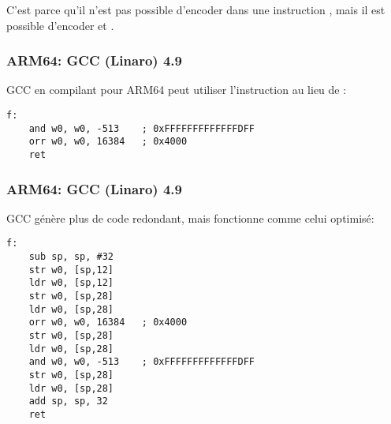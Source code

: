 C'est parce qu'il n'est pas possible d'encoder  dans une instruction ,
mais il est possible d'encoder  et .

\subsubsection{ARM64: GCC (Linaro) 4.9 \Optimizing}

GCC en compilant \Optimizing pour ARM64 peut utiliser l'instruction \AND au
lieu de :

\begin{lstlisting}[caption=GCC (Linaro) 4.9 \Optimizing,style=customasmARM]
f:
	and	w0, w0, -513	; 0xFFFFFFFFFFFFFDFF
	orr	w0, w0, 16384	; 0x4000
	ret
\end{lstlisting}

\subsubsection{ARM64: GCC (Linaro) 4.9 \NonOptimizing}

GCC \NonOptimizing génère plus de code redondant, mais fonctionne comme celui optimisé:

\begin{lstlisting}[caption=GCC (Linaro) 4.9 \NonOptimizing,style=customasmARM]
f:
	sub	sp, sp, #32
	str	w0, [sp,12]
	ldr	w0, [sp,12]
	str	w0, [sp,28]
	ldr	w0, [sp,28]
	orr	w0, w0, 16384	; 0x4000
	str	w0, [sp,28]
	ldr	w0, [sp,28]
	and	w0, w0, -513	; 0xFFFFFFFFFFFFFDFF
	str	w0, [sp,28]
	ldr	w0, [sp,28]
	add	sp, sp, 32
	ret
\end{lstlisting}
